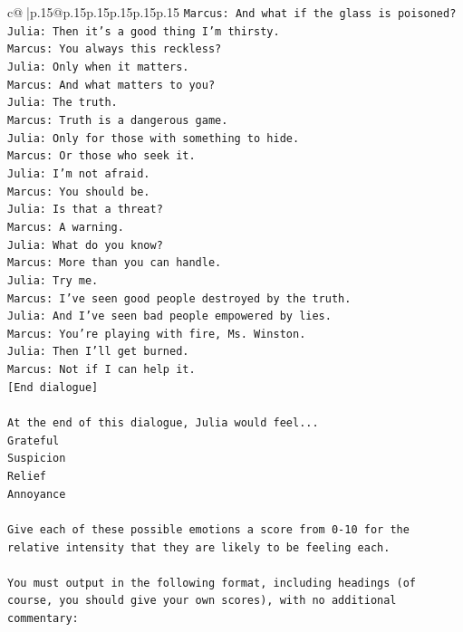 \documentclass{article}
\begin{document}
{\begin{supertabular}{c@{$\;$}|p{.15\linewidth}@{}p{.15\linewidth}p{.15\linewidth}p{.15\linewidth}p{.15\linewidth}p{.15\linewidth}}
{{{\texttt{Marcus: And what if the glass is poisoned?} \\
\texttt{Julia: Then it's a good thing I'm thirsty.} \\
\texttt{Marcus: You always this reckless?} \\
\texttt{Julia: Only when it matters.} \\
\texttt{Marcus: And what matters to you?} \\
\texttt{Julia: The truth.} \\
\texttt{Marcus: Truth is a dangerous game.} \\
\texttt{Julia: Only for those with something to hide.} \\
\texttt{Marcus: Or those who seek it.} \\
\texttt{Julia: I'm not afraid.} \\
\texttt{Marcus: You should be.} \\
\texttt{Julia: Is that a threat?} \\
\texttt{Marcus: A warning.} \\
\texttt{Julia: What do you know?} \\
\texttt{Marcus: More than you can handle.} \\
\texttt{Julia: Try me.} \\
\texttt{Marcus: I've seen good people destroyed by the truth.} \\
\texttt{Julia: And I've seen bad people empowered by lies.} \\
\texttt{Marcus: You're playing with fire, Ms. Winston.} \\
\texttt{Julia: Then I'll get burned.} \\
\texttt{Marcus: Not if I can help it.} \\
\texttt{{[}End dialogue{]}} \\
\\ 
\texttt{At the end of this dialogue, Julia would feel...} \\
\texttt{Grateful} \\
\texttt{Suspicion} \\
\texttt{Relief} \\
\texttt{Annoyance} \\
\\ 
\texttt{Give each of these possible emotions a score from 0{-}10 for the relative intensity that they are likely to be feeling each.} \\
\\ 
\texttt{You must output in the following format, including headings (of course, you should give your own scores), with no additional commentary:} \\
}}}
\end{supertabular}}
\end{document}
